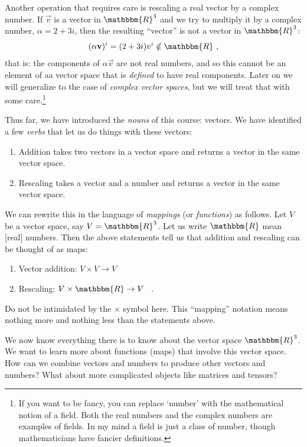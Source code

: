 \documentclass[12pt]{article}
\begin{document}
Another operation that requires care is rescaling a real vector by a complex number. If $\vec{v}$ is a vector in $\mathbbm{R}^3$ and we try to multiply it by a complex number, $\alpha = 2+3i$, then the resulting ``vector'' is not a vector in $\mathbbm{R}^3$:
\begin{align}
    (\alpha\vec{v})^i = (2+3i)v^i \notin \mathbbm{R} \ ,
\end{align}
that is: the components of $\alpha\vec{v}$ are not real numbers, and so this cannot be an element of aa vector space that is \emph{defined} to have real components. Later on we will generalize to the case of \emph{complex vector spaces}, but we will treat that with some care.\footnote{If you want to be fancy, you can replace `number' with the mathematical notion of a field. Both the real numbers and the complex numbers are examples of fields. In my mind a field is just a class of number, though mathematicians have fancier definitions.}

Thus far, we have introduced the \emph{nouns} of this course: vectors. We have identified a few \emph{verbs} that let us do things with these vectors:
\begin{enumerate}
    \item Addition takes two vectors in a vector space and returns a vector in the same vector space. 
    \item Rescaling takes a vector and a number and returns a vector in the same vector space.
\end{enumerate}
We can rewrite this in the language of \emph{mappings} (or \emph{functions}) as follows. Let $V$ be a vector space, say $V=\mathbbm{R}^3$. Let us write $\mathbbm{R}$ mean [real] numbers. Then the above statements tell us that addition and rescaling can be thought of as maps:
\begin{enumerate}
    \item Vector addition: $V\times V \to V$
    \item Rescaling: $V\times \mathbbm{R} \to V$ \ .
\end{enumerate}
Do not be intimidated by the $\times$ symbol here. This ``mapping'' notation means nothing more and nothing less than the statements above.

We now know everything there is to know about the vector space $\mathbbm{R}^3$. We want to learn more about functions (maps) that involve this vector space. How can we combine vectors and numbers to produce other vectors and numbers? What about more complicated objects like matrices and tensors? 
\end{document}
